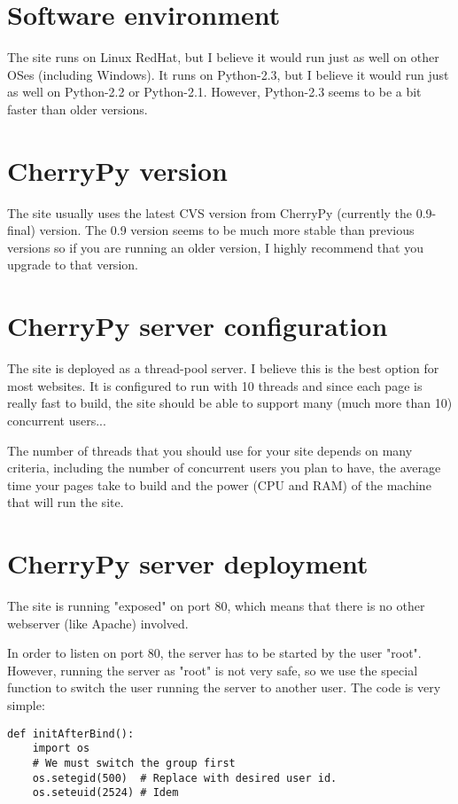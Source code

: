 \documentclass{manual}
\begin{document}
\section{Software environment}
The site runs on Linux RedHat, but I believe it would run just as well on other OSes (including Windows).
It runs on Python-2.3, but I believe it would run just as well on Python-2.2 or Python-2.1. However, Python-2.3 seems
to be a bit faster than older versions.

\section{CherryPy version}
The site usually uses the latest CVS version from CherryPy (currently the 0.9-final) version.
The 0.9 version seems to be much more stable than previous versions so if you are running an older version, I
highly recommend that you upgrade to that version.

\section{CherryPy server configuration}
The site is deployed as a thread-pool server. I believe this is the best option for most websites.
It is configured to run with 10 threads and since each page is really fast to build, the site should be able to support
many (much more than 10) concurrent users...

The number of threads that you should use for your site depends on many criteria, including the number of concurrent
users you plan to have, the average time your pages take to build and the power (CPU and RAM) of the machine that
will run the site.

\section{CherryPy server deployment}
The site is running "exposed" on port 80, which means that there is no other webserver (like Apache) involved.

In order to listen on port 80, the server has to be started by the user "root". However, running the server as "root"
is not very safe, so we use the special function  to switch the user running the server to another
user. The code is very simple:

\begin{verbatim}
def initAfterBind():
    import os
    # We must switch the group first
    os.setegid(500)  # Replace with desired user id.
    os.seteuid(2524) # Idem
\end{verbatim}
\end{document}
